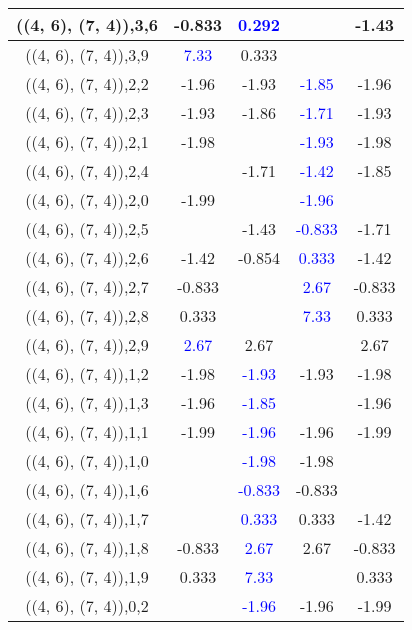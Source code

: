 \documentclass{article}
\begin{document}
\begin{center}
\begin{longtable}{|c|c|c|c|c|}
        	\hline
        	((4, 6), (7, 4)),3,6&-0.833& \textcolor{blue}{0.292}&&-1.43\\
        	\hline
        	((4, 6), (7, 4)),3,9& \textcolor{blue}{7.33}&0.333&&\\
        	\hline
        	((4, 6), (7, 4)),2,2&-1.96&-1.93& \textcolor{blue}{-1.85}&-1.96\\
        	\hline
        	((4, 6), (7, 4)),2,3&-1.93&-1.86& \textcolor{blue}{-1.71}&-1.93\\
        	\hline
        	((4, 6), (7, 4)),2,1&-1.98&& \textcolor{blue}{-1.93}&-1.98\\
        	\hline
        	((4, 6), (7, 4)),2,4&&-1.71& \textcolor{blue}{-1.42}&-1.85\\
        	\hline
        	((4, 6), (7, 4)),2,0&-1.99&& \textcolor{blue}{-1.96}&\\
        	\hline
        	((4, 6), (7, 4)),2,5&&-1.43& \textcolor{blue}{-0.833}&-1.71\\
        	\hline
        	((4, 6), (7, 4)),2,6&-1.42&-0.854& \textcolor{blue}{0.333}&-1.42\\
        	\hline
        	((4, 6), (7, 4)),2,7&-0.833&& \textcolor{blue}{2.67}&-0.833\\
        	\hline
        	((4, 6), (7, 4)),2,8&0.333&& \textcolor{blue}{7.33}&0.333\\
        	\hline
        	((4, 6), (7, 4)),2,9& \textcolor{blue}{2.67}&2.67&&2.67\\
        	\hline
        	((4, 6), (7, 4)),1,2&-1.98& \textcolor{blue}{-1.93}&-1.93&-1.98\\
        	\hline
        	((4, 6), (7, 4)),1,3&-1.96& \textcolor{blue}{-1.85}&&-1.96\\
        	\hline
        	((4, 6), (7, 4)),1,1&-1.99& \textcolor{blue}{-1.96}&-1.96&-1.99\\
        	\hline
        	((4, 6), (7, 4)),1,0&& \textcolor{blue}{-1.98}&-1.98&\\
        	\hline
        	((4, 6), (7, 4)),1,6&& \textcolor{blue}{-0.833}&-0.833&\\
        	\hline
        	((4, 6), (7, 4)),1,7&& \textcolor{blue}{0.333}&0.333&-1.42\\
        	\hline
        	((4, 6), (7, 4)),1,8&-0.833& \textcolor{blue}{2.67}&2.67&-0.833\\
        	\hline
        	((4, 6), (7, 4)),1,9&0.333& \textcolor{blue}{7.33}&&0.333\\
        	\hline
        	((4, 6), (7, 4)),0,2&& \textcolor{blue}{-1.96}&-1.96&-1.99\\

\end{longtable}
\end{center}
\end{document}
